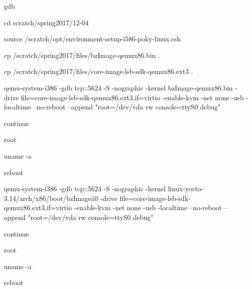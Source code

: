 \documentclass[draftclsnofoot,onecolumn,10pt]{article}
\begin{document}
    \begin{flushleft}
    gdb\
    \end{flushleft}
    \begin{flushleft}
    cd scratch/spring2017/12-04\
    \end{flushleft}
    \begin{flushleft}
    source /scratch/opt/environment-setup-i586-poky-linux.csh\
    \end{flushleft}
    \begin{flushleft}
    cp /scratch/spring2017/files/bzImage-qemux86.bin .\
    \end{flushleft}
    \begin{flushleft}
    cp /scratch/spring2017/files/core-image-lsb-sdk-qemux86.ext3 .\
    \end{flushleft}
    \begin{flushleft}
    \cf2 \expnd0
    \end{flushleft}
    \begin{flushleft}
    qemu-system-i386 -gdb tcp::5624 -S -nographic -kernel bzImage-qemux86.bin -drive file=core-image-lsb-sdk-qemux86.ext3,if=virtio -enable-kvm -net none -usb -localtime --no-reboot --append "root=/dev/vda rw console=ttyS0 debug"\
    \end{flushleft}
    \begin{flushleft}
    continue\
    \end{flushleft}
    \begin{flushleft}
    root\
    \end{flushleft}
    \begin{flushleft}
    uname -a\
    \end{flushleft}
    \begin{flushleft}
    reboot\
    \end{flushleft}
    \begin{flushleft}
    qemu-system-i386 -gdb tcp::5624 -S -nographic -kernel linux-yocto-3.14/arch/x86/boot/bzImage\'a0 -drive file=core-image-lsb-sdk-qemux86.ext3,if=virtio -enable-kvm -net none -usb -localtime --no-reboot --append "root=/dev/vda rw console=ttyS0 debug"\
    \end{flushleft}
    \begin{flushleft}
    continue\
    \end{flushleft}
    \begin{flushleft}
    root\
    \end{flushleft}
    \begin{flushleft}
    uname -a\
    \end{flushleft}
    \begin{flushleft}
    reboot\
\end{flushleft}
        
\end{document}
